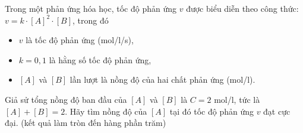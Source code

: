 \begin{bt}%
	Trong một  phản ứng hóa học, tốc độ phản ứng $v$ được biểu diễn theo công thức: $v=k\cdot[A]^2\cdot[B]$, trong đó
	\begin{itemize}
		 \item $v$ là tốc độ phản ứng (mol/l/s),
		\item $k=0{,}1$ là hằng số tốc  độ phản ứng,
		\item $[A]$ và $[B]$ lần lượt là nồng độ của hai chất  phản ứng (mol/l).
	\end{itemize}
	Giả sử tổng nồng độ ban đầu của $[A]$ và $[B]$ là $C=2$ mol/l, tức là $[A]+[B]=2$. Hãy tìm  nồng độ của $[A]$ tại đó tốc độ phản ứng $v$ đạt cực đại. (kết quả làm tròn đến hàng phần trăm)
\end{bt}

